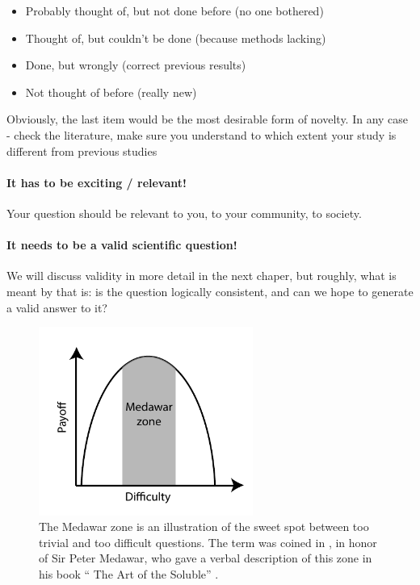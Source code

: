 \documentclass{tufte-book}
\begin{document}
\begin{itemize}
\item Probably thought of, but not done before (no one bothered)
\item Thought of, but couldn’t be done (because methods lacking)
\item Done, but wrongly (correct previous results)
\item Not thought of before (really new)
\end{itemize}

Obviously, the last item would be the most desirable form of novelty. In any case - check the literature, make sure you understand to which extent your study is different from previous studies

\paragraph{It has to be exciting / relevant!} Your question should be relevant to you, to your community, to society. 

\paragraph{It needs to be a valid scientific question!} We will discuss validity in more detail in the next chaper, but roughly, what is meant by that is: is the question logically consistent, and can we hope to generate a valid answer to it?


\begin{figure}[]
\begin{center}
\includegraphics[width = 7cm]{figures/MedawarZone}
\caption{The Medawar zone is an illustration of the sweet spot between too trivial and too difficult questions. The term was coined in \citet{Loehle-guidetoincreased-1990}, in honor of Sir Peter Medawar, who gave a verbal description of this zone in his book `` The Art of the Soluble'' \citep{Medawar-artsoluble-1967}.}
\label{fig: MedawarZone}
\end{center}
\end{figure}
\end{document}
